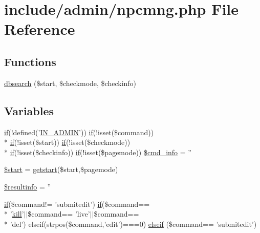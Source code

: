 \hypertarget{npcmng_8php}{\section{include/admin/npcmng.php File Reference}
\label{npcmng_8php}
}
\subsection*{Functions}
\begin{DoxyCompactItemize}
\item 
\hyperlink{npcmng_8php_ab73b2f52f5b37f4e82c009aa977ce5b5}{dbsearch} (\$start, \$checkmode, \$checkinfo)
\end{DoxyCompactItemize}
\subsection*{Variables}
\begin{DoxyCompactItemize}
\item 
\hyperlink{login__old_8php_a4ac1118c2e44c513a674bc1793ba6c90}{if}(!defined('\hyperlink{admin_8php_ad49472b0cdee543164375bf133a537f1}{I\+N\+\_\+\+A\+D\+M\+I\+N}')) \hyperlink{login__old_8php_a4ac1118c2e44c513a674bc1793ba6c90}{if}(!isset(\$command)) \\*
\hyperlink{login__old_8php_a4ac1118c2e44c513a674bc1793ba6c90}{if}(!isset(\$start)) \hyperlink{login__old_8php_a4ac1118c2e44c513a674bc1793ba6c90}{if}(!isset(\$checkmode)) \\*
\hyperlink{login__old_8php_a4ac1118c2e44c513a674bc1793ba6c90}{if}(!isset(\$checkinfo)) \hyperlink{login__old_8php_a4ac1118c2e44c513a674bc1793ba6c90}{if}(!isset(\$pagemode)) \hyperlink{npcmng_8php_abeffdbe990926c69b5d0bdb6505e39c3}{\$cmd\+\_\+info} = ''
\item 
\hyperlink{npcmng_8php_a50a00e7de77365e00b117e73aa82fb9b}{\$start} = \hyperlink{admin_8php_a774c9803a78dae80dd7b9a2301393b4a}{getstart}(\$start,\$pagemode)
\item 
\hyperlink{npcmng_8php_a65157e6920113390d5fb39352a29157d}{\$resultinfo} = ''
\item 
\hyperlink{login__old_8php_a4ac1118c2e44c513a674bc1793ba6c90}{if}(\$command!= 'submitedit') \hyperlink{login__old_8php_a4ac1118c2e44c513a674bc1793ba6c90}{if}(\$command== \\*
'\hyperlink{state_8func_8php_a2fedf1cfccaaaef7e5fff0033ded8dfc}{kill}'$\vert$$\vert$\$command== 'live'$\vert$$\vert$\$command== \\*
'del') elseif(strpos(\$command,'edit')===0) \hyperlink{npcmng_8php_aebac72f4767ff39b22abc0d8f2793660}{elseif} (\$command== 'submitedit')
\end{DoxyCompactItemize}


